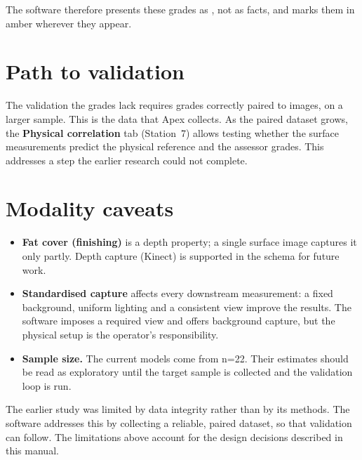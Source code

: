 The software therefore presents these grades as , not as
facts, and marks them in amber wherever they appear.

\section{Path to validation}

The validation the grades lack requires grades correctly paired to images, on a
larger sample. This is the data that Apex collects. As the paired dataset grows,
the \textbf{Physical correlation} tab (Station~7) allows testing whether the
surface measurements predict the physical reference and the assessor grades. This
addresses a step the earlier research could not complete.

\section{Modality caveats}

\begin{itemize}[leftmargin=1.3em,itemsep=3pt]
  \item \textbf{Fat cover (finishing)} is a depth property; a single surface
        image captures it only partly. Depth capture (Kinect) is supported in the
        schema for future work.
  \item \textbf{Standardised capture} affects every downstream measurement: a
        fixed background, uniform lighting and a consistent view improve the
        results. The software imposes a required view and offers background
        capture, but the physical setup is the operator's responsibility.
  \item \textbf{Sample size.} The current models come from n=22. Their estimates
        should be read as exploratory until the target sample is collected and
        the validation loop is run.
\end{itemize}

\begin{note}[title=Summary]
The earlier study was limited by data integrity rather than by its methods. The
software addresses this by collecting a reliable, paired dataset, so that
validation can follow. The limitations above account for the design decisions
described in this manual.
\end{note}
